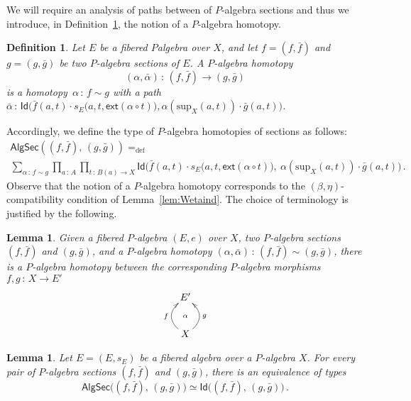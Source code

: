 \documentclass[10pt,a4paper,oneside,reqno]{amsart}
\theoremstyle{mythm}
\newtheorem{lemma}[theorem]{Lemma}
\theoremstyle{mydef}
\newtheorem{definition}[theorem]{Definition}
\theoremstyle{myrmk}
\newcommand{\defeq}{=_{\mathrm{def}}}
\newcommand{\co}{\,{:}\,}
\newcommand{\ct}{\cdot}
\newcommand{\ext}{\mathsf{ext}}
\newcommand{\Id}{\mathsf{Id}}
\renewcommand{\sup}{\mathrm{sup}}
\newcommand{\AlgSecHot}{\mathsf{AlgSec}}
\begin{document}
We will require an analysis of paths between of $P$-algebra sections and thus we introduce, in Definition~\ref{def:W2cellsection}, the
notion of a $P$-algebra homotopy.

\begin{definition} \label{def:W2cellsection} Let $E$ be a fibered $P$algebra over $X$, and let $f = (f, \bar{f})$ and $g = (g, \bar{g})$ be two $P$-algebra sections of $E$.  A \emph{$P$-algebra homotopy} 
\[
(\alpha , \bar{\alpha}) \co (f, \bar{f})  \rightarrow (g, \bar{g})
\] 
is a homotopy~$\alpha \co f \sim g$ with a path
$\bar{\alpha} \co 
\Id\big( \bar{f}(a,t)  \ct s_E\big(a,t, \ext (\alpha \circ t) \big),
\alpha(\sup_X(a,t)) \ct \bar{g}(a,t) \big)$. 
\end{definition} 

Accordingly, we define the type of $P$-algebra homotopies of sections as follows:
\begin{multline*}
\AlgSecHot( (f, \bar{f}) ,\, (g, \bar{g}) )  \defeq \\ 
\sum_{\alpha \co f \sim g} \prod_{a \co A} \prod_{t \co B(a) \to X} 
\Id\big( \bar{f}(a,t)  \ct s_E \big(a,t, \ext (\alpha \circ t) \big),\ 
\alpha(\sup_X(a,t)) \ct \bar{g}(a,t) \big) \, .
\end{multline*}
Observe that the notion of a $P$-algebra homotopy corresponds to the $(\beta, \eta)$-compatibility condition of 
Lemma~\ref{lem:Wetaind}.  The choice of terminology is justified by the following.

\begin{lemma}\label{lem:fibalghom}
Given a fibered $P$-algebra $(E, e)$ over $X$, two $P$-algebra sections $(f, \bar{f})$ and $(g, \bar{g})$, and a 
$P$-algebra homotopy $(\alpha, \bar{\alpha}) \co (f, \bar{f}) \sim (g, \bar{g})$, there is a $P$-algebra homotopy between the corresponding $P$-algebra morphisms $f, g \co X \to E'$ 
\[
\xymatrix{
 E' \ar@{}[d]|{\alpha} \\ 
X \ar@/^1.2pc/[u]^{f}  \ar@/_1.2pc/[u]_{g}
}
 \]
\end{lemma}




\begin{lemma}\label{lem:fibhomeqid} Let $E = (E, s_E)$ be a fibered algebra over a $P$-algebra $X$.
For every pair of $P$-algebra sections $(f, \bar{f})$ and $(g, \bar{g})$,  there is an equivalence of types
\[
\AlgSecHot\big( (f, \bar{f}) ,\, (g, \bar{g}) \big) 
\simeq 
\Id \big( (f, \bar{f}) ,\, (g, \bar{g}) \big) \, .
\]
\end{lemma}
\end{document}
